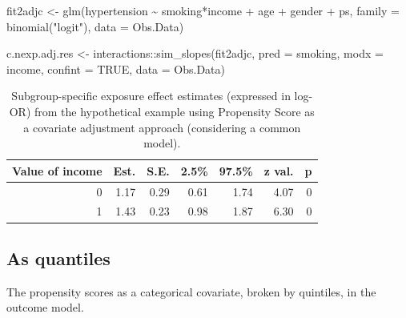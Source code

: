\documentclass[
  letterpaper,
  DIV=11,
  numbers=noendperiod]{scrreprt}
\newenvironment{Shaded}{\begin{snugshade}}{\end{snugshade}}
\newcommand{\AttributeTok}[1]{\textcolor[rgb]{0.40,0.45,0.13}{#1}}
\newcommand{\ConstantTok}[1]{\textcolor[rgb]{0.56,0.35,0.01}{#1}}
\newcommand{\FunctionTok}[1]{\textcolor[rgb]{0.28,0.35,0.67}{#1}}
\newcommand{\NormalTok}[1]{\textcolor[rgb]{0.00,0.23,0.31}{#1}}
\newcommand{\OtherTok}[1]{\textcolor[rgb]{0.00,0.23,0.31}{#1}}
\newcommand{\SpecialCharTok}[1]{\textcolor[rgb]{0.37,0.37,0.37}{#1}}
\newcommand{\StringTok}[1]{\textcolor[rgb]{0.13,0.47,0.30}{#1}}
\begin{document}
\begin{Shaded}
\begin{Highlighting}[]
\NormalTok{fit2adjc }\OtherTok{\textless{}{-}} \FunctionTok{glm}\NormalTok{(hypertension }\SpecialCharTok{\textasciitilde{}}\NormalTok{ smoking}\SpecialCharTok{*}\NormalTok{income }\SpecialCharTok{+}\NormalTok{ age }\SpecialCharTok{+}\NormalTok{ gender }\SpecialCharTok{+}\NormalTok{ ps, }
                \AttributeTok{family =} \FunctionTok{binomial}\NormalTok{(}\StringTok{"logit"}\NormalTok{), }
                \AttributeTok{data =}\NormalTok{ Obs.Data)}

\NormalTok{c.nexp.adj.res }\OtherTok{\textless{}{-}}\NormalTok{ interactions}\SpecialCharTok{::}\FunctionTok{sim\_slopes}\NormalTok{(fit2adjc,}
                                           \AttributeTok{pred =}\NormalTok{ smoking, }
                                           \AttributeTok{modx =}\NormalTok{ income,}
                                           \AttributeTok{confint =} \ConstantTok{TRUE}\NormalTok{,}
                                           \AttributeTok{data =}\NormalTok{ Obs.Data)}
\end{Highlighting}
\end{Shaded}

\hypertarget{tbl-cont-var2}{}
\begin{table}[!h]
\caption{\label{tbl-cont-var2}Subgroup-specific exposure effect estimates (expressed in log-OR) from
the hypothetical example using Propensity Score as a covariate
adjustment approach (considering a common model). }\tabularnewline

\centering
\begin{tabular}{rrrrrrr}
\toprule
Value of income & Est. & S.E. & 2.5\% & 97.5\% & z val. & p\\
\midrule
0 & 1.17 & 0.29 & 0.61 & 1.74 & 4.07 & 0\\
1 & 1.43 & 0.23 & 0.98 & 1.87 & 6.30 & 0\\
\bottomrule
\end{tabular}
\end{table}

\hypertarget{as-quantiles}{%
\subsection{As quantiles}\label{as-quantiles}}

The propensity scores as a categorical covariate, broken by quintiles,
in the outcome model.
\end{document}
